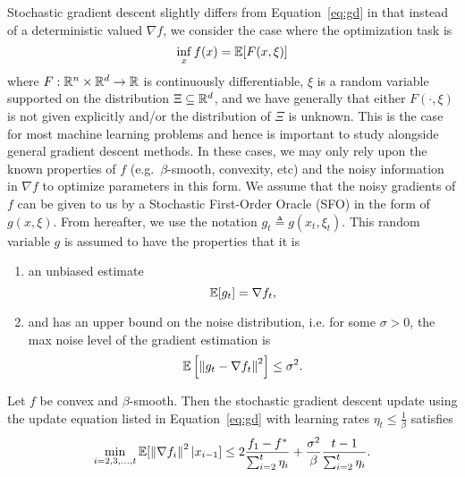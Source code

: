 Stochastic gradient descent slightly differs from Equation~\ref{eq:gd} in that
instead of a deterministic valued $\nabla f$, we consider the case where the
optimization task is 
\begin{equation}
    \inf_x f(x) = \mathbb E[F(x, \xi)]
\end{equation}
where $F:\mathbb R^n \times \mathbb R^d \rightarrow \mathbb R$ is continuously differentiable, $\xi
$ is a random variable supported on the distribution $\Xi \subseteq \mathbb R^d$, and we have generally that
either $F(\cdot, \xi)$ is not given explicitly and/or the distribution of $\Xi$
is unknown. This is the case for most machine learning problems and hence is
important to study alongside general gradient descent methods. In these cases,
we may only rely upon the known properties of $f$ (e.g.\ $\beta$-smooth,
convexity, etc) and the noisy information in $\nabla f$ to optimize parameters
in this form. We assume that the noisy gradients of $f$ can be
given to us by a Stochastic First-Order Oracle (SFO) in the form of $g(x, \xi)$.
From hereafter, we use the notation $g_t \triangleq g(x_t, \xi_t)$.
This random variable $g$ is assumed to have the properties that it is 
\begin{enumerate}
    \item an unbiased estimate \begin{equation}\mathbb E[g_t] = \nabla
    f_t,\end{equation}
    \item and has an upper bound on the noise distribution, i.e. for some
        $\sigma > 0$, the max noise level of the gradient estimation is
        \begin{equation}
            \mathbb E \left[ \left\| g_t - \nabla f_t \right\|^2 \right] \leq \sigma^2.
        \end{equation}
\end{enumerate}

\begin{theorem}
   Let $f$ be convex and $\beta$-smooth. Then the stochastic gradient descent
    update using the update equation listed in Equation~\ref{eq:gd} with
    learning rates $\eta_t \leq \frac{1}{\beta}$ satisfies
    \begin{equation}
        \min_{i = 2, 3, \dots, t} \mathbb E[\left\| \nabla f_i \right\|^2|x_{i - 1}]
        \leq
        2\frac{f_1 - f^*}{ \sum^{t}_{i=2} \eta_i } + \frac{\sigma^2
        }{\beta}\frac{t - 1}{ \sum_{i=2}^t\eta_i}.
    \end{equation}
\end{theorem}

